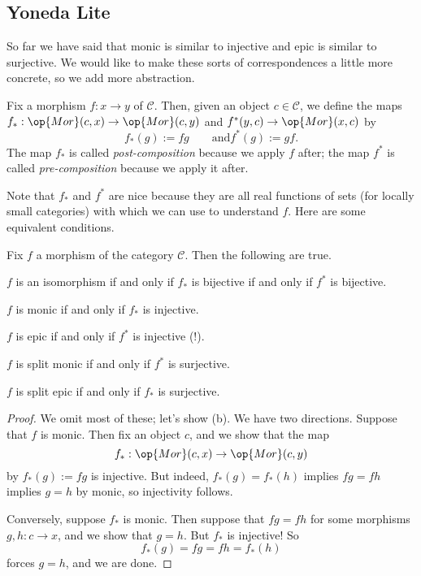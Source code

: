 \subsection{Yoneda Lite}
So far we have said that monic is similar to injective and epic is similar to surjective. We would like to make these sorts of correspondences a little more concrete, so we add more abstraction.
\begin{definition}
	Fix a morphism $f:x\to y$ of $\mathcal C$. Then, given an object $c\in\mathcal C$, we define the maps $f_*:\op{Mor}(c,x)\to\op{Mor}(c,y)$ and $f^*(y,c)\to\op{Mor}(x,c)$ by
	\[f_*(g):=fg\qquad\text{and}f^*(g):=gf.\]
	The map $f_*$ is called \textit{post-composition} because we apply $f$ after; the map $f^*$ is called \textit{pre-composition} because we apply it after.
\end{definition}


Note that $f_*$ and $f^*$ are nice because they are all real functions of sets (for locally small categories) with which we can use to understand $f$. Here are some equivalent conditions.
\begin{proposition}
	Fix $f$ a morphism of the category $\mathcal C$. Then the following are true.
	\begin{listalph}
		\item $f$ is an isomorphism if and only if $f_*$ is bijective if and only if $f^*$ is bijective.
		\item $f$ is monic if and only if $f_*$ is injective.
		\item $f$ is epic if and only if $f^*$ is injective (!).
		\item $f$ is split monic if and only if $f^*$ is surjective.
		\item $f$ is split epic if and only if $f_*$ is surjective.
	\end{listalph}
\end{proposition}
\begin{proof}
	We omit most of these; let's show (b). We have two directions. Suppose that $f$ is monic. Then fix an object $c$, and we show that the map
	\[f_*:\op{Mor}(c,x)\to\op{Mor}(c,y)\]
	by $f_*(g):=fg$ is injective. But indeed, $f_*(g)=f_*(h)$ implies $fg=fh$ implies $g=h$ by monic, so injectivity follows.

	Conversely, suppose $f_*$ is monic. Then suppose that $fg=fh$ for some morphisms $g,h:c\to x$, and we show that $g=h$. But $f_*$ is injective! So
	\[f_*(g)=fg=fh=f_*(h)\]
	forces $g=h$, and we are done.
\end{proof}